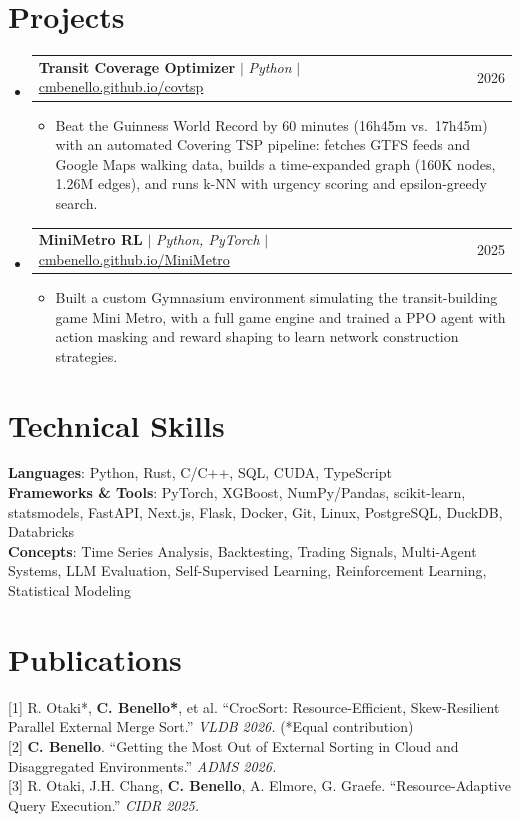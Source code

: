 \documentclass[letterpaper,10pt]{article}
\makeatletter
\newcommand{\resumeItem}[1]{
  \item\small{
    {#1 \vspace{-3pt}}
  }
}
\newcommand{\resumeProjectHeading}[2]{
    \item
    \begin{tabular*}{0.99\textwidth}{l@{\extracolsep{\fill}}r}
      \small#1 & #2 \\
    \end{tabular*}\vspace{-8pt}
}
\newcommand{\resumeSubHeadingListStart}{\begin{itemize}[leftmargin=0.015in, label={}]}
\newcommand{\resumeSubHeadingListEnd}{\end{itemize}}
\newcommand{\resumeItemListStart}{\begin{itemize}[leftmargin=0.15in]}
\newcommand{\resumeItemListEnd}{\end{itemize}\vspace{-7pt}}
\makeatother
\begin{document}
\section{Projects}
    \resumeSubHeadingListStart
      \resumeProjectHeading
          {\textbf{Transit Coverage Optimizer} $|$ \emph{Python} $|$ \small{\href{https://cmbenello.github.io/covtsp}{cmbenello.github.io/covtsp}}}{2026}
          \resumeItemListStart
            \resumeItem{Beat the Guinness World Record by 60 minutes (16h45m vs.\ 17h45m) with an automated Covering TSP pipeline: fetches GTFS feeds and Google Maps walking data, builds a time-expanded graph (160K nodes, 1.26M edges), and runs k-NN with urgency scoring and epsilon-greedy search.}
          \resumeItemListEnd
      \resumeProjectHeading
          {\textbf{MiniMetro RL} $|$ \emph{Python, PyTorch} $|$ \small{\href{https://cmbenello.github.io/MiniMetro}{cmbenello.github.io/MiniMetro}}}{2025}
          \resumeItemListStart
            \resumeItem{Built a custom Gymnasium environment simulating the transit-building game Mini Metro, with a full game engine and trained a PPO agent with action masking and reward shaping to learn network construction strategies.}
          \resumeItemListEnd
    \resumeSubHeadingListEnd

\section{Technical Skills}
 \begin{itemize}[leftmargin=0.015in, label={}]
    \small{\item{
     \textbf{Languages}{: Python, Rust, C/C++, SQL, CUDA, TypeScript} \\
     \textbf{Frameworks \& Tools}{: PyTorch, XGBoost, NumPy/Pandas, scikit-learn, statsmodels, FastAPI, Next.js, Flask, Docker, Git, Linux, PostgreSQL, DuckDB, Databricks} \\
     \textbf{Concepts}{: Time Series Analysis, Backtesting, Trading Signals, Multi-Agent Systems, LLM Evaluation, Self-Supervised Learning, Reinforcement Learning, Statistical Modeling}
    }}
 \end{itemize}\vspace{-9pt}

\section{Publications}
 \begin{itemize}[leftmargin=0.015in, label={}]
    \small{\item{
     {[1] R. Otaki*, \textbf{C. Benello*}, et al. ``CrocSort: Resource-Efficient, Skew-Resilient Parallel External Merge Sort.'' \textit{VLDB 2026.} (*Equal contribution)} \\
     {[2] \textbf{C. Benello}. ``Getting the Most Out of External Sorting in Cloud and Disaggregated Environments.'' \textit{ADMS 2026.}} \\
     {[3] R. Otaki, J.H. Chang, \textbf{C. Benello}, A. Elmore, G. Graefe. ``Resource-Adaptive Query Execution.'' \textit{CIDR 2025.}}
    }}
 \end{itemize}\vspace{-9pt}
\end{document}
